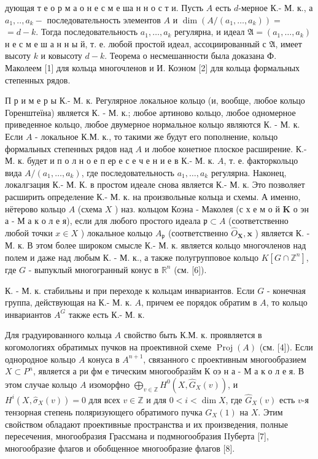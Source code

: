 \documentclass[10pt]{article}
\begin{document}
дующая т е о р м а о н е с м е ша н н о с т и. Пусть $A$ есть $d$-мерное К.- М. к., а $a_{1}, . ., a_{k}-$ последовательность элементов $A$ и $\operatorname{dim}\left(A /\left(a_{1}, \ldots, a_{k}\right)\right)=$ $=d-k$. Тогда последовательность $a_{1}, \ldots, a_{k}$ регулярна, и идеал $\mathfrak{A}=\left(a_{1}, \ldots, a_{k}\right)$ н е с м е ш а н н ы й, т. е. любой простой идеал, ассоциированный с $\mathfrak{A}$, имеет высоту $k$ и ковысоту $d-k$. Теорема о несмешанности была доказана Ф. Маколеем [1] для кольца многочленов и И. Коэном [2] для кольца формальных степенных рядов.



П р и м е р ы К.- М. к. Регулярное локальное кольцо (и, вообще, любое кольцо Горенштеїна) является К. - М. к.; любое артиново кольцо, любое одномерное приведенное кольцо, любое двумерное нормальное кольцо являются К. - М. к. Если $A$ - локальное К.М. к., то такими же будут его пополнение, кольцо формальных степенных рядов над $A$ и любое конетное плоское расширение. К.- М. к. будет и п о л н о е п ер е с е ч е н и е в К.- М. к. $A$, т. е. факторкольцо вида $A /\left(a_{1}, \ldots, a_{k}\right)$, где последовательность $a_{1}, \ldots, a_{k}$ регулярна. Наконец, локалгзация К.- М. К. в простом идеале снова является К.- М. к. Это позволяет расширить определение К.- М. к. на произвольные кольца и схемы. А именно, нётерово кольцо $A$ (схема $X$ ) наз. кольцом Коэна - Маколея (с х е м о й $\mathbf{K}$ о эн а - М а к о л е я), если для любого простого идеала $\mathfrak{p} \subset A$ (соответственно любой точки $x \in X$ ) локальное кольцо $A_{\mathfrak{p}}$ (соответственно $\hat{O}_{\boldsymbol{X}}, \boldsymbol{x}$ ) является К. - М. к. В этом более широком смысле К.- М. к. является кольцо многочленов над полем и даже над любым К. - М. к., а также полугрупповое кольцо $K\left[G \cap \mathbb{Z}^{n}\right]$, где $G$ - выпуклый многогранный конус в $\mathbb{R}^{n}$ (см. [6]).



К. - М. к. стабильны и при переходе к кольцам инвариантов. Если $G$ - конечная группа, действующая на К.- М. к. $A$, причем ее порядок обратим в $A$, то кольцо инвариантов $A^{G}$ также есть К.- М. к.



Для градуированного кольца $A$ свойство быть К.М. к. проявляется в когомологиях обратимых пучков на проективной схеме $\operatorname{Proj}(A)$ (см. [4]). Если однородное кольцо $A$ конуса в $A^{n+1}$, связанного с проективным многообразием $X \subset P^{n}$, является а ри фм е тическим многообразйм К оэ н а - М а к о л е я. В этом случае кольцо $A$ изоморфно $\bigoplus_{v \in \mathbb{Z}} H^{0}\left(X, \widehat{G}_{X}(v)\right)$, и $H^{i}\left(X, \widehat{\sigma}_{X}(v)\right)=0$ для всех $v \in \mathbb{Z}$ и для $0<i<\operatorname{dim} X$, где $\widehat{G}_{X}(v)$ есть $v$-я тензорная степень поляризующего обратимого пучка $G_{X}(1)$ на $X$. Этим свойством обладают проективные пространства и их произведения, полные пересечения, многообразия Грассмана и подмногообразия IIуберта [7], многообразие флагов и обобщенное многообразие флагов [8].
\end{document}
